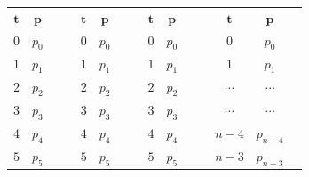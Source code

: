 \documentclass
[twocolumn,
secnumarabic,
nobibnotes,
aps,
prl,
reprint,
groupedaddress,
amsmath,
amssymb,
]{revtex4-2}
\begin{document}
\begin{center}
  \begin{tabular}{|c|c|cc|c|c|cc|c|c|cc|c|c|c}
    \cline{1-2} \cline{5-6} \cline{9-10} \cline{13-14}
    $\mathbf{t}$ & $\mathbf{p}$                  &                &  & $\mathbf{t}$ & $\mathbf{p}$                  &                &  & $\mathbf{t}$ & $\mathbf{p}$                  &                &  & $\mathbf{t}$ & $\mathbf{p}$                      &                \\ \cline{1-2} \cline{5-6} \cline{9-10} \cline{13-14}
    $0$        & \cellcolor[HTML]{C0C0C0}$p_0$ &                &  & $0$        & $p_0$                         &                &  & $0$        & $p_0$                         &                &  & ${0}$   & $p_{0}$                        &                \\ \cline{1-2} \cline{5-6} \cline{9-10} \cline{13-14}
    $1$        & \cellcolor[HTML]{C0C0C0}$p_1$ &                &  & $1$        & \cellcolor[HTML]{C0C0C0}$p_1$ &                &  & $1$        & $p_1$                         &                &  & ${1}$    & $p_{1}$                         &                \\ \cline{1-2} \cline{5-6} \cline{9-10} \cline{13-14}
    $2$        & \cellcolor[HTML]{C0C0C0}$p_2$ &                &  & $2$        & \cellcolor[HTML]{C0C0C0}$p_2$ &                &  & $2$        & \cellcolor[HTML]{C0C0C0}$p_2$ &       &  & $\cdots$    & $\cdots$                         &       \\ \cline{1-2} \cline{5-6} \cline{9-10} \cline{13-14}
    $3$        & \cellcolor[HTML]{C0C0C0}$p_3$ &                &  & $3$        & \cellcolor[HTML]{C0C0C0}$p_3$ &                &  & $3$        & \cellcolor[HTML]{C0C0C0}$p_3$ &       &  & $\cdots$    & $\cdots$                         &       \\ \cline{1-2} \cline{5-6} \cline{9-10} \cline{13-14}
    $4$        & \cellcolor[HTML]{EB7D7D}$p_4$ &                &  & $4$        & \cellcolor[HTML]{C0C0C0}$p_4$ &                &  & $4$        & \cellcolor[HTML]{C0C0C0}$p_4$ &                &  & ${n-4}$    & $p_{n-4}$                         &                \\ \cline{1-2} \cline{5-6} \cline{9-10} \cline{13-14}
    $5$        & \cellcolor[HTML]{EB7D7D}$p_5$ &                &  & $5$        & \cellcolor[HTML]{EB7D7D}$p_5$ &                &  & $5$        & \cellcolor[HTML]{C0C0C0}$p_5$ &       &  & ${n-3}$    & \cellcolor[HTML]{C0C0C0}$p_{n-3}$ &       \\ \cline{1-2} \cline{5-6} \cline{9-10} \cline{13-14}

\end{tabular}
\end{center}
\end{document}
